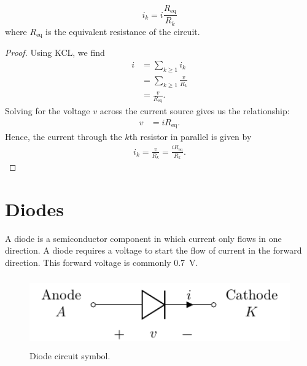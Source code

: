 \documentclass{article}
\begin{document}
\begin{theorem}
    \begin{equation*}
        i_k = i \frac{R_{\mathrm{eq}}}{R_k}
    \end{equation*}
    where \(R_{\mathrm{eq}}\) is the equivalent resistance of the circuit.
\end{theorem}
\begin{proof}
    Using KCL, we find
    \begin{align*}
        i & = \sum_{k\geq1} i_k           \\
          & = \sum_{k\geq1} \frac{v}{R_k} \\
          & = \frac{v}{R_{\mathrm{eq}}}.
    \end{align*}
    Solving for the voltage \(v\) across the current source gives us the
    relationship:
    \begin{align*}
        v & = i R_{\mathrm{eq}}.
    \end{align*}
    Hence, the current through the \(k\)th resistor in parallel is given
    by
    \begin{align*}
        i_k = \frac{v}{R_k} = \frac{iR_{\mathrm{eq}}}{R_k}.
    \end{align*}
\end{proof}
\newpage
\section{Diodes}
\begin{definition}[Diode]
    A diode is a semiconductor component in which current only flows in
    one direction. A diode requires a voltage to start the flow of
    current in the forward direction. This forward voltage is commonly
    \qty{0.7}{V}.
\end{definition}
\begin{figure}[H]
    \centering
    \includegraphics[height = 3cm, keepaspectratio = true]{figures/diode.pdf}
    \caption{Diode circuit symbol.}
\end{figure}
\end{document}

